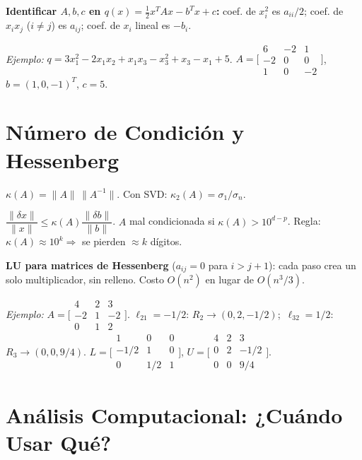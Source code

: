 \documentclass[12pt,a4paper]{article}
\begin{document}
\textbf{Identificar $A,b,c$ en $q(x)=\tfrac{1}{2}x^TAx-b^Tx+c$:}
coef. de $x_i^2$ es $a_{ii}/2$; coef. de $x_ix_j$ ($i\ne j$) es $a_{ij}$; coef. de $x_i$ lineal es $-b_i$.

\textit{Ejemplo:} $q=3x_1^2-2x_1x_2+x_1x_3-x_3^2+x_3-x_1+5$.
$A=\bigl[\begin{smallmatrix}6&-2&1\\-2&0&0\\1&0&-2\end{smallmatrix}\bigr]$, $b=(1,0,-1)^T$, $c=5$.

\section{Número de Condición y Hessenberg}

$\kappa(A)=\|A\|\,\|A^{-1}\|$. Con SVD: $\kappa_2(A)=\sigma_1/\sigma_n$.

\begin{resultado}
$\dfrac{\|\delta x\|}{\|x\|}\le\kappa(A)\dfrac{\|\delta b\|}{\|b\|}$.
$A$ mal condicionada si $\kappa(A)>10^{d-p}$. Regla: $\kappa(A)\approx10^k\Rightarrow$ se pierden $\approx k$ dígitos.
\end{resultado}

\textbf{LU para matrices de Hessenberg} ($a_{ij}=0$ para $i>j+1$): cada paso crea un solo multiplicador, sin relleno. Costo $O(n^2)$ en lugar de $O(n^3/3)$.

\textit{Ejemplo:} $A=\bigl[\begin{smallmatrix}4&2&3\\-2&1&-2\\0&1&2\end{smallmatrix}\bigr]$.
$\ell_{21}=-1/2$: $R_2\to(0,2,-1/2)$;\ $\ell_{32}=1/2$: $R_3\to(0,0,9/4)$.
$L=\bigl[\begin{smallmatrix}1&0&0\\-1/2&1&0\\0&1/2&1\end{smallmatrix}\bigr]$,
$U=\bigl[\begin{smallmatrix}4&2&3\\0&2&-1/2\\0&0&9/4\end{smallmatrix}\bigr]$.

\section{Análisis Computacional: ¿Cuándo Usar Qué?}
\end{document}
